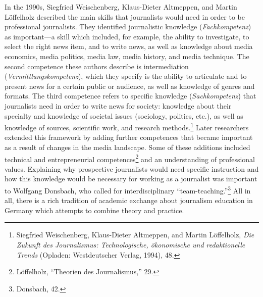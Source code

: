 \documentclass{tufte-handout}
\begin{document}
In the 1990s, Siegfried Weischenberg, Klaus-Dieter Altmeppen, and Martin
Löffelholz described the main skills that journalists would need in
order to be professional journalists. They identified journalistic
knowledge (\emph{Fachkompetenz}) as important---a skill which included,
for example, the ability to investigate, to select the right news item,
and to write news, as well as knowledge about media economics, media
politics, media law, media history, and media technique. The second
competence these authors describe is intermediation
(\emph{Vermittlungskompetenz}), which they specify is the ability to
articulate and to present news for a certain public or audience, as well
as knowledge of genres and formats. The third competence refers to
specific knowledge (\emph{Sachkompetenz}) that journalists need in order
to write news for society: knowledge about their specialty and knowledge
of societal issues (sociology, politics, etc.), as well as knowledge of
sources, scientific work, and research methods.\footnote{Siegfried
  Weischenberg, Klaus-Dieter Altmeppen, and Martin Löffelholz, \emph{Die
  Zukunft des Journalismus: Technologische, ökonomische und
  redaktionelle Trends} (Opladen: Westdeutscher Verlag, 1994), 48.}
Later researchers extended this framework by adding further competences
that became important as a result of changes in the media landscape.
Some of these additions included technical and entrepreneurial
competences\footnote{Löffelholz, ``Theorien des Journalismus,'' 29.} and
an understanding of professional values. Explaining why prospective
journalists would need specific instruction and how this knowledge would
be necessary for working as a journalist was important to Wolfgang
Donsbach, who called for interdisciplinary ``team-teaching.''\footnote{Donsbach,
  42.} All in all, there is a rich tradition of academic exchange about
journalism education in Germany which attempts to combine theory and
practice.
\end{document}

